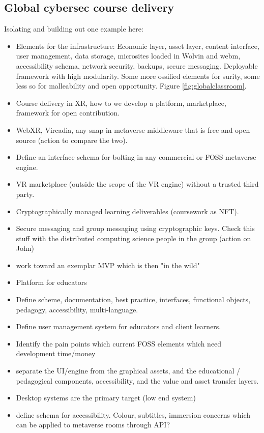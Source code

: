 \subsection{Global cybersec course delivery}
Isolating and building out one example here:
\begin{itemize}
\item Elements for the infrastructure: Economic layer, asset layer, content interface, user management, data storage, microsites loaded in Wolvin and webm, accessibility schema, network security, backups, secure messaging. Deployable framework with high modularity. Some more ossified elements for surity, some less so for malleability and open opportunity. Figure \ref{fig:globalclassroom}.
\item Course delivery in XR, how to we develop a platform, marketplace, framework for open contribution.
\item WebXR, Vircadia, any snap in metaverse middleware that is free and open source (action to compare the two). 
\item Define an interface schema for bolting in any commercial or FOSS metaverse engine.
\item VR marketplace (outside the scope of the VR engine) without a trusted third party.
\item Cryptographically managed learning deliverables (coursework as NFT). 
\item Secure messaging and group messaging using cryptographic keys. Check this stuff with the distributed computing science people in the group (action on John)
\item work toward an exemplar MVP which is then "in the wild"
\item Platform for educators
\item Define scheme, documentation, best practice, interfaces, functional objects, pedagogy, accessibility, multi-language. 
\item Define user management system for educators and client learners.
\item Identify the pain points which current FOSS elements which need development time/money
\item separate the UI/engine from the graphical assets, and the educational / pedagogical components, accessibility, and the value and asset transfer layers.
\item Desktop systems are the primary target (low end system)
\item define schema for accessibility. Colour, subtitles, immersion concerns which can be applied to metaverse rooms through API?

\end{itemize}

